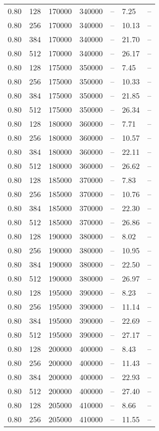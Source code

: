\begin{tabular}{l|l|l|l|l|l|l}
0.80 & 128 & 170000 & 340000 & -- &  7.25 & --\\
0.80 & 256 & 170000 & 340000 & -- & 10.13 & --\\
0.80 & 384 & 170000 & 340000 & -- & 21.70 & --\\
0.80 & 512 & 170000 & 340000 & -- & 26.17 & --\\
0.80 & 128 & 175000 & 350000 & -- &  7.45 & --\\
0.80 & 256 & 175000 & 350000 & -- & 10.33 & --\\
0.80 & 384 & 175000 & 350000 & -- & 21.85 & --\\
0.80 & 512 & 175000 & 350000 & -- & 26.34 & --\\
0.80 & 128 & 180000 & 360000 & -- &  7.71 & --\\
0.80 & 256 & 180000 & 360000 & -- & 10.57 & --\\
0.80 & 384 & 180000 & 360000 & -- & 22.11 & --\\
0.80 & 512 & 180000 & 360000 & -- & 26.62 & --\\
0.80 & 128 & 185000 & 370000 & -- &  7.83 & --\\
0.80 & 256 & 185000 & 370000 & -- & 10.76 & --\\
0.80 & 384 & 185000 & 370000 & -- & 22.30 & --\\
0.80 & 512 & 185000 & 370000 & -- & 26.86 & --\\
0.80 & 128 & 190000 & 380000 & -- &  8.02 & --\\
0.80 & 256 & 190000 & 380000 & -- & 10.95 & --\\
0.80 & 384 & 190000 & 380000 & -- & 22.50 & --\\
0.80 & 512 & 190000 & 380000 & -- & 26.97 & --\\
0.80 & 128 & 195000 & 390000 & -- &  8.23 & --\\
0.80 & 256 & 195000 & 390000 & -- & 11.14 & --\\
0.80 & 384 & 195000 & 390000 & -- & 22.69 & --\\
0.80 & 512 & 195000 & 390000 & -- & 27.17 & --\\
0.80 & 128 & 200000 & 400000 & -- &  8.43 & --\\
0.80 & 256 & 200000 & 400000 & -- & 11.43 & --\\
0.80 & 384 & 200000 & 400000 & -- & 22.93 & --\\
0.80 & 512 & 200000 & 400000 & -- & 27.40 & --\\
0.80 & 128 & 205000 & 410000 & -- &  8.66 & --\\
0.80 & 256 & 205000 & 410000 & -- & 11.55 & --\\

\end{tabular}
